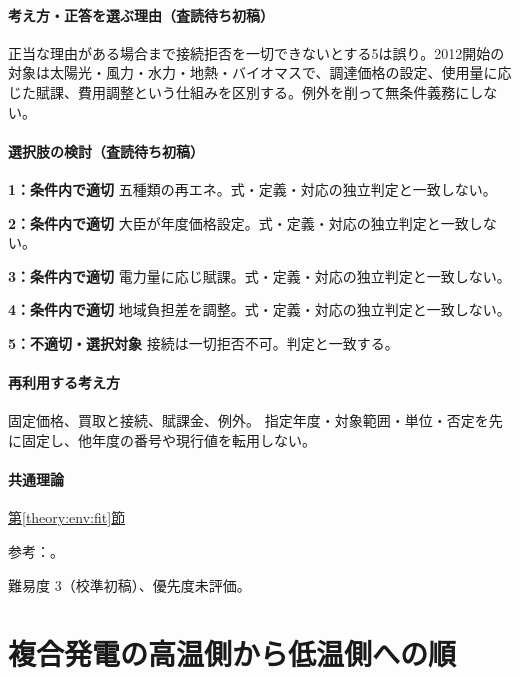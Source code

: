 \paragraph{考え方・正答を選ぶ理由（査読待ち初稿）} 正当な理由がある場合まで接続拒否を一切できないとする5は誤り。2012開始の対象は太陽光・風力・水力・地熱・バイオマスで、調達価格の設定、使用量に応じた賦課、費用調整という仕組みを区別する。例外を削って無条件義務にしない。

\paragraph{選択肢の検討（査読待ち初稿）}\mbox{}\par

\noindent\textbf{1：条件内で適切} 五種類の再エネ。式・定義・対応の独立判定と一致しない。\par

\noindent\textbf{2：条件内で適切} 大臣が年度価格設定。式・定義・対応の独立判定と一致しない。\par

\noindent\textbf{3：条件内で適切} 電力量に応じ賦課。式・定義・対応の独立判定と一致しない。\par

\noindent\textbf{4：条件内で適切} 地域負担差を調整。式・定義・対応の独立判定と一致しない。\par

\noindent\textbf{5：不適切・選択対象} 接続は一切拒否不可。判定と一致する。\par

\paragraph{再利用する考え方} 固定価格、買取と接続、賦課金、例外。 指定年度・対象範囲・単位・否定を先に固定し、他年度の番号や現行値を転用しない。

\paragraph{共通理論} \hyperref[theory:env:fit]{第\ref*{theory:env:fit}節}

\par 参考：\cite{env58_fit2013}。

\par 難易度 3（校準初稿）、優先度未評価。

\section{複合発電の高温側から低温側への順}


